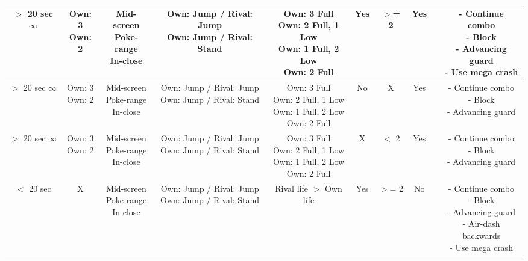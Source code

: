 \documentclass{article}
\begin{document}
\begin{landscape}
\begin{table}[h!]
\begin{center}
\begin{tabular*}{27cm}{c|c|c|c|c|c|c|c|c|c}
      \hline
      \makecell{$>$ 20 sec \\ $\infty$} & \makecell {Own: 3 \\ Own: 2} & \makecell{Mid-screen \\ Poke-range\\ In-close} & \makecell{Own: Jump / Rival: Jump \\ Own: Jump / Rival: Stand} & \makecell {Own: 3 Full \\ Own: 2 Full, 1 Low \\ Own: 1 Full, 2 Low \\ Own: 2 Full} & Yes & $>$= 2 & Yes & & \makecell{- Continue combo \\ - Block \\ - Advancing guard \\ - Use mega crash}\\
      \hline
      \makecell{$>$ 20 sec \\ $\infty$} & \makecell {Own: 3 \\ Own: 2} & \makecell{Mid-screen \\ Poke-range\\ In-close} & \makecell{Own: Jump / Rival: Jump \\ Own: Jump / Rival: Stand} & \makecell {Own: 3 Full \\ Own: 2 Full, 1 Low \\ Own: 1 Full, 2 Low \\ Own: 2 Full} & No & X & Yes & & \makecell{- Continue combo \\ - Block \\ - Advancing guard}\\
      \hline
      \makecell{$>$ 20 sec \\ $\infty$} & \makecell {Own: 3 \\ Own: 2} & \makecell{Mid-screen \\ Poke-range\\ In-close} & \makecell{Own: Jump / Rival: Jump \\ Own: Jump / Rival: Stand} & \makecell {Own: 3 Full \\ Own: 2 Full, 1 Low \\ Own: 1 Full, 2 Low \\ Own: 2 Full} & X & $<$ 2 & Yes & & \makecell{- Continue combo \\ - Block \\ - Advancing guard}\\
      \hline
      $<$ 20 sec & X & \makecell{Mid-screen \\ Poke-range\\ In-close} & \makecell{Own: Jump / Rival: Jump \\ Own: Jump / Rival: Stand} & Rival life $>$ Own life & Yes & $>$= 2 & No & & \makecell{- Continue combo \\ - Block \\ - Advancing guard \\ - Air-dash backwards \\ - Use mega crash}\\

\end{tabular*}
\end{center}
\end{table}
\end{landscape}
\end{document}
